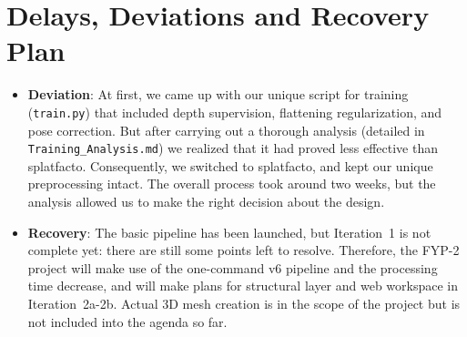 \section{Delays, Deviations and Recovery Plan}
\begin{itemize}
    \item \textbf{Deviation}: At first, we came up with our unique script for training (\texttt{train.py}) that included depth supervision, flattening regularization, and pose correction. But after carrying out a thorough analysis (detailed in \texttt{Training\_Analysis.md}) we realized that it had proved less effective than splatfacto. Consequently, we switched to splatfacto, and kept our unique preprocessing intact. The overall process took around two weeks, but the analysis allowed us to make the right decision about the design.
    \item \textbf{Recovery}: The basic pipeline has been launched, but Iteration~1 is not complete yet: there are still some points left to resolve. Therefore, the FYP-2 project will make use of the one-command v6 pipeline and the processing time decrease, and will make plans for structural layer and web workspace in Iteration~2a-2b. Actual 3D mesh creation is in the scope of the project but is not included into the agenda so far.
\end{itemize}
